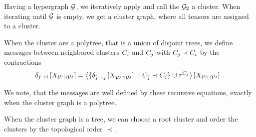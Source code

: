 
Having a hypergraph $\mathcal{G}$, we iteratively apply  and call the $\mathcal{G}_2$ a cluster.
When iterating until $\mathcal{G}$ is empty, we get a cluster graph, where all tensors are assigned to a cluster.

When the cluster are a polytree, that is a union of disjoint trees, we define messages between neighbored clusters $C_{i}$ and $C_{j}$ with $C_{j}\prec C_{i}$ by the contractions
\begin{align*}
	\delta_{j \rightarrow i}\left[X_{\mathcal{V}^{i}\cap\mathcal{V}^{j}}\right]
	= \left\langle \{
	\delta_{\tilde{j} \rightarrow j}\left[X_{\mathcal{V}^{\tilde{j}}\cap\mathcal{V}^{j}}\right]
	\,:\, C_{\tilde{j}}\prec C_{j}\} \cup \tau^{C_{j}}\right\rangle \left[ X_{\mathcal{V}^{i}\cap\mathcal{V}^{j}} \right] \, .
\end{align*}



We note, that the messages are well defined by these recursive equations, exactly when the cluster graph is a polytree.

When the cluster graph is a tree, we can choose a root cluster and order the clusters by the topological order $\prec$.


